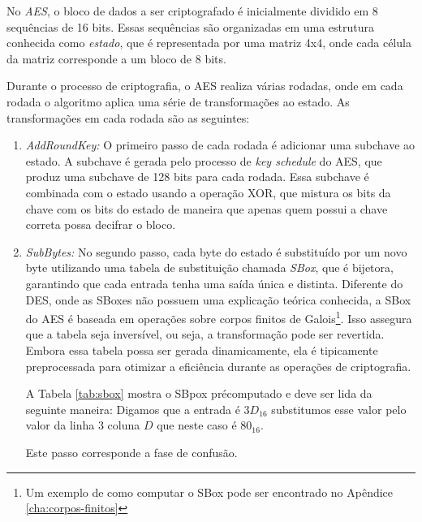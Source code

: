 No \textit{AES}, o bloco de dados a ser criptografado é inicialmente dividido em 8 sequências de 16 bits. Essas sequências são organizadas em uma estrutura conhecida como \textit{estado}, que é representada por uma matriz 4x4, onde cada célula da matriz corresponde a um bloco de 8 bits.

Durante o processo de criptografia, o AES realiza várias rodadas, onde em cada rodada o algoritmo aplica uma série de transformações ao estado.
As transformações em cada rodada são as seguintes:

\begin{enumerate}
\item {\em AddRoundKey:}
  O primeiro passo de cada rodada é adicionar uma subchave ao estado.
  A subchave é gerada pelo processo de \textit{key schedule} do AES, que produz uma subchave de 128 bits para cada rodada.
  Essa subchave é combinada com o estado usando a operação XOR, que mistura os bits da chave com os bits do estado de maneira que apenas quem possui a chave correta possa decifrar o bloco.

\item {\em SubBytes:}
  No segundo passo, cada byte do estado é substituído por um novo byte utilizando uma tabela de substituição chamada {\em SBox}, que é bijetora, garantindo que cada entrada tenha uma saída única e distinta.
  Diferente do DES, onde as SBoxes não possuem uma explicação teórica conhecida, a SBox do AES é baseada em operações sobre corpos finitos de Galois\footnote{Um exemplo de como computar o SBox pode ser encontrado no Apêndice \ref{cha:corpos-finitos}}.
  Isso assegura que a tabela seja inversível, ou seja, a transformação pode ser revertida.
  Embora essa tabela possa ser gerada dinamicamente, ela é tipicamente preprocessada para otimizar a eficiência durante as operações de criptografia.
  
  A Tabela \ref{tab:sbox} mostra o SBpox précomputado e deve ser lida da seguinte maneira:
  Digamos que a entrada é $3D_{16}$ substitumos esse valor pelo valor da linha $3$ coluna $D$ que neste caso é $80_{16}$.
  
  Este passo corresponde a fase de confusão.


\end{enumerate}
